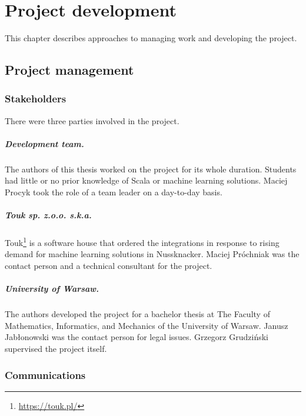 \chapter{Project development}
\label{chap:project-development}

This chapter describes approaches to managing work and developing the project.

\section{Project management}

\subsection{Stakeholders}

There were three parties involved in the project.

\paragraph{Development team.}
The authors of this thesis worked on the project for its whole duration.
Students had little or no prior knowledge of Scala or machine learning solutions.
Maciej Procyk took the role of a team leader on a day-to-day basis.

\paragraph{Touk sp. z.o.o. s.k.a.}
Touk\footnote{\href{https://touk.pl/}{https://touk.pl/}} is a software house that ordered the integrations in response to rising demand for machine learning solutions in Nussknacker.
Maciej Próchniak was the contact person and a technical consultant for the project.

\paragraph{University of Warsaw.}
The authors developed the project for a bachelor thesis at The Faculty of Mathematics, Informatics, and Mechanics of the University of Warsaw.
Janusz Jabłonowski was the contact person for legal issues.
Grzegorz Grudziński supervised the project itself.

\subsection{Communications}

